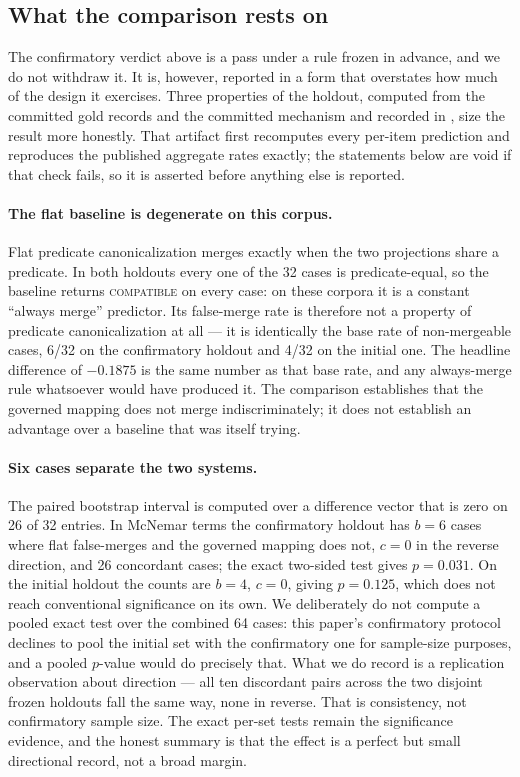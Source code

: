 \subsection{What the comparison rests on}

The confirmatory verdict above is a pass under a rule frozen in advance, and we
do not withdraw it. It is, however, reported in a form that overstates how much
of the design it exercises. Three properties of the holdout, computed from the
committed gold records and the committed mechanism and recorded in
, size the result
more honestly. That artifact first recomputes every per-item prediction and
reproduces the published aggregate rates exactly; the statements below are void
if that check fails, so it is asserted before anything else is reported.

\paragraph{The flat baseline is degenerate on this corpus.} Flat predicate
canonicalization merges exactly when the two projections share a predicate. In
both holdouts every one of the 32 cases is predicate-equal, so the baseline
returns \textsc{compatible} on every case: on these corpora it is a constant
``always merge'' predictor. Its false-merge rate is therefore not a property of
predicate canonicalization at all --- it is identically the base rate of
non-mergeable cases, 6/32 on the confirmatory holdout and 4/32 on the initial
one. The headline difference of $-0.1875$ is the same number as that base rate,
and any always-merge rule whatsoever would have produced it. The comparison
establishes that the governed mapping does not merge indiscriminately; it does
not establish an advantage over a baseline that was itself trying.

\paragraph{Six cases separate the two systems.} The paired bootstrap interval is
computed over a difference vector that is zero on 26 of 32 entries. In McNemar
terms the confirmatory holdout has $b=6$ cases where flat false-merges and the
governed mapping does not, $c=0$ in the reverse direction, and 26 concordant
cases; the exact two-sided test gives $p=0.031$. On the initial holdout the
counts are $b=4$, $c=0$, giving $p=0.125$, which does not reach conventional
significance on its own. We deliberately do not compute a pooled exact test over
the combined 64 cases: this paper's confirmatory protocol declines to pool the
initial set with the confirmatory one for sample-size purposes, and a pooled
$p$-value would do precisely that. What we do record is a replication
observation about direction --- all ten discordant pairs across the two disjoint
frozen holdouts fall the same way, none in reverse. That is consistency, not
confirmatory sample size. The exact per-set tests remain the significance
evidence, and the honest summary is that the effect is a perfect but small
directional record, not a broad margin.

